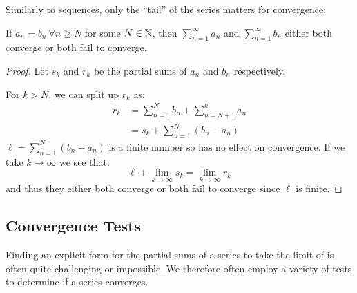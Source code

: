 \documentclass[../main.tex]{subfiles}
\begin{document}
Similarly to sequences, only the ``tail'' of the series matters for convergence:
\begin{lemma}
  If $a_n = b_n\ \forall n \geq N$ for some $N \in \mathbb{N}$, then $\sum_{n = 1}^{\infty} a_n$ and $\sum_{n = 1}^{\infty} b_n$ either both converge or both fail to converge.
  \label{seriesTail}
\end{lemma}
\begin{proof}
  Let $s_k$ and $r_k$ be the partial sums of $a_n$ and $b_n$ respectively.

  For $k > N$, we can split up $r_k$ as:
  \begin{align*}
    r_k &= \sum_{n = 1}^{N} b_n + \sum_{n = N + 1}^{k} a_n \\
        &= s_k + \sum_{n = 1}^{N} (b_n - a_n)
  \end{align*}
  $\ell = \sum_{n = 1}^{N} (b_n - a_n)$ is a finite number so has no effect on convergence.
  If we take $k \to \infty$ we see that:
  \[
    \ell + \lim_{k \to \infty} s_k = \lim_{k \to \infty} r_k
  \]
  and thus they either both converge or both fail to converge since $\ell$ is finite.
\end{proof}
\subsection{Convergence Tests}
\label{convergenceTests}
Finding an explicit form for the partial sums of a series to take the limit of is often quite challenging or impossible.
We therefore often employ a variety of tests to determine if a series converges.
\end{document}
